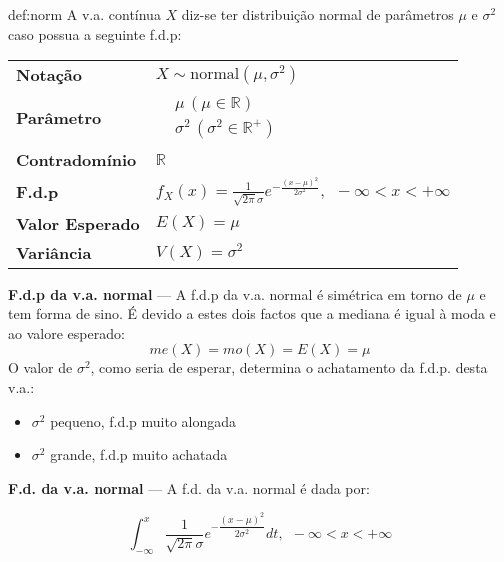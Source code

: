 \begin{theo}{def:norm}\label{def:norm}
\noindent A v.a. contínua $X$ diz-se ter distribuição normal de parâmetros $\mu$ e $\sigma^2$ caso possua a seguinte f.d.p:

\vspace{1 em}
\begin{center}
\begin{tabular}{p{4cm}p{8cm}}
\toprule
\textbf{Notação} & $X \sim \text{normal}(\mu,\sigma^2)$\\
\addlinespace
\textbf{Parâmetro} & $\begin{aligned}
                        &\mu\, (\mu \in \mathbb{R})\\
                        &\sigma^2\, (\sigma^2 \in \mathbb{R}^+)
                     \end{aligned}$\\
\addlinespace
\textbf{Contradomínio} & $\mathbb{R}$\\
\addlinespace
\textbf{F.d.p} & $f_X(x)= \frac{1}{\sqrt{2 \pi} \sigma}e^{-\frac{(x - \mu)^2}{2\sigma^2}},\,\; -\infty < x < +\infty$\\
\addlinespace
\textbf{Valor Esperado} & $E(X) = \mu$\\
\addlinespace
\textbf{Variância} & $V(X) = \sigma^2$\\
\bottomrule
\end{tabular}
\end{center}

\vspace{0.5 em}
\end{theo}

\noindent \textbf{F.d.p da v.a. normal} --- A f.d.p da v.a. normal é simétrica em torno de $\mu$ e tem forma de sino. É devido a estes dois factos que a mediana é igual à moda e ao valore esperado:
$$
    \boxed{me(X) = mo(X) = E(X) = \mu}
$$
\noindent O valor de $\sigma^2$, como seria de esperar, determina o achatamento da f.d.p. desta v.a.:
\begin{itemize}
    \item $\sigma^2$ pequeno, f.d.p muito alongada
    \item $\sigma^2$ grande, f.d.p muito achatada
\end{itemize}

\noindent \textbf{F.d. da v.a. normal} --- A f.d. da v.a. normal é dada por:

$$
    \int_{-\infty}^x \dfrac{1}{\sqrt{2 \pi} \sigma}e^{-\dfrac{(x - \mu)^2}{2\sigma^2}}dt,\,\; -\infty < x < +\infty
$$

